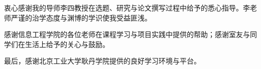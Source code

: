 衷心感谢我的导师李四教授在选题、研究与论文撰写过程中给予的悉心指导。李老师严谨的治学态度与渊博的学识使我受益匪浅。

感谢信息工程学院的各位老师在课程学习与项目实践中提供的帮助；感谢室友与同学们在生活上给予的关心与鼓励。

最后，感谢北京工业大学耿丹学院提供的良好学习环境与平台。